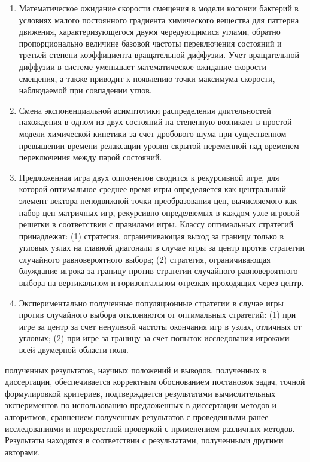 {}
\begin{enumerate}[beginpenalty=10000] %
    \item Математическое ожидание скорости смещения в модели колонии бактерий в условиях малого постоянного градиента химического вещества для паттерна движения, характеризующегося двумя чередующимися углами, обратно пропорционально величине базовой частоты переключения состояний и третьей степени коэффициента вращательной диффузии. Учет вращательной диффузии в системе уменьшает математическое ожидание скорости смещения, а также приводит к появлению точки максимума скорости, наблюдаемой при совпадении углов.
    \item Смена экспоненциальной асимптотики распределения длительностей нахождения в одном из двух состояний на степенную возникает в простой модели химической кинетики за счет дробового шума при существенном превышении времени релаксации уровня скрытой переменной над временем переключения между парой состояний. 
    \item Предложенная игра двух оппонентов сводится к рекурсивной игре, для которой оптимальное среднее время игры определяется как центральный элемент вектора неподвижной точки преобразования цен, вычисляемого как набор цен матричных игр, рекурсивно определяемых в каждом узле игровой решетки в соответствии с правилами игры. Классу оптимальных стратегий принадлежат: (1) стратегия, ограничивающая выход за границу только в угловых узлах на главной диагонали в случае игры за центр против стратегии случайного равновероятного выбора; (2) стратегия, ограничивающая блуждание игрока за границу против стратегии случайного равновероятного выбора на вертикальном и горизонтальном отрезках проходящих через центр.
    \item Экспериментально полученные популяционные стратегии в случае игры против случайного выбора отклоняются от оптимальных стратегий: (1) при игре за центр за счет ненулевой частоты окончания игр в узлах, отличных от угловых; (2) при игре за границу за счет попыток исследования игроками всей двумерной области поля. 
\end{enumerate}

{\reliability} полученных результатов, научных положений и выводов, полученных в диссертации, обеспечивается корректным обоснованием постановок задач, точной формулировкой критериев, подтверждается результатами вычислительных экспериментов по использованию предложенных в диссертации методов и алгоритмов, сравнением полученных результатов с проведенными ранее исследованиями и перекрестной проверкой с применением различных методов. Результаты находятся в соответствии с результатами, полученными другими авторами.

